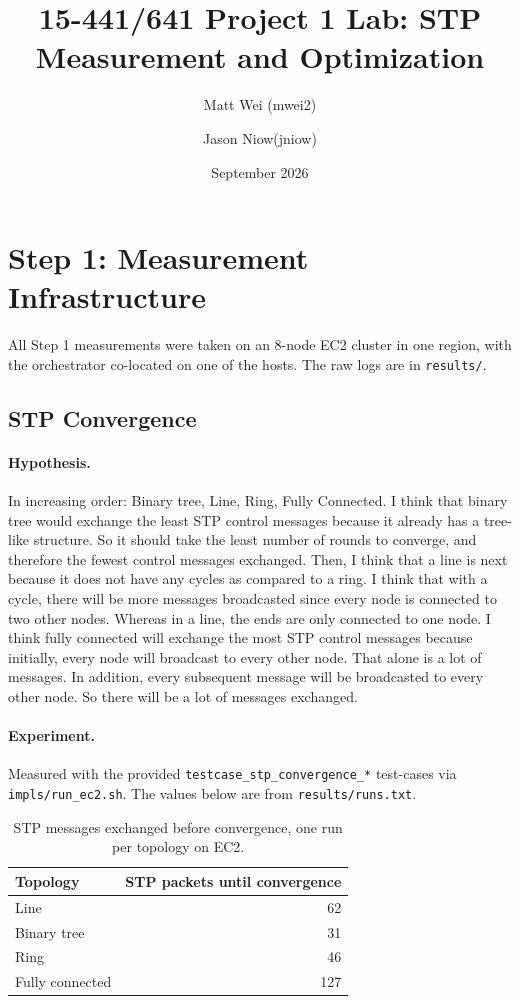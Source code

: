 \documentclass[11pt]{article}
\title{15-441/641 Project 1 Lab: STP Measurement and Optimization}
\author{Matt Wei (mwei2) \and Jason Niow(jniow)}
\date{September 2026}
\begin{document}
\maketitle

\section{Step 1: Measurement Infrastructure}

All Step 1 measurements were taken on an 8-node EC2 cluster in one region, with the orchestrator co-located on one of the hosts.
The raw logs are in \texttt{results/}.

\subsection{STP Convergence}

\paragraph{Hypothesis.}
In increasing order: Binary tree, Line, Ring, Fully Connected. I think that binary tree would exchange the least STP control messages
 because it already has a tree-like structure. So it should take the least number of rounds to converge, and therefore the fewest control messages exchanged. 
 Then, I think that a line is next because it does not have any cycles as compared to a ring. I think that with a cycle, there will be more messages broadcasted
 since every node is connected to two other nodes. Whereas in a line, the ends are only connected to one node. I think fully connected 
 will exchange the most STP control messages because initially, every node will broadcast to every other node. That alone is a lot of messages.
 In addition, every subsequent message will be broadcasted to every other node. So there will be a lot of messages exchanged.
\paragraph{Experiment.}
Measured with the provided \texttt{testcase\_stp\_convergence\_*} test-cases via \texttt{impls/run\_ec2.sh}.
The values below are from \texttt{results/runs.txt}.

\begin{table}[h]
\centering
\begin{tabular}{lr}
\toprule
Topology & STP packets until convergence \\
\midrule
Line & 62 \\
Binary tree & 31 \\
Ring & 46 \\
Fully connected & 127 \\
\bottomrule
\end{tabular}
\caption{STP messages exchanged before convergence, one run per topology on EC2.}
\end{table}
\end{document}
